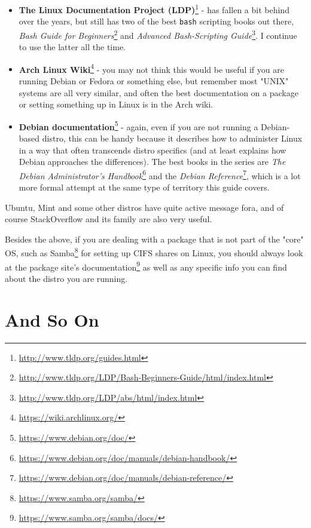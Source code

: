 \documentclass[10pt,american,]{book}
\renewcommand{\href}[2]{#2\footnote{\url{#1}}}
\numberwithin{figure}{chapter}
\DeclareRobustCommand{\drios}[1]{\index{OS and OS-Like Substances!#1}}
\begin{document}
\begin{itemize}
\item
  \href{http://www.tldp.org/guides.html}{\textbf{The Linux Documentation
  Project (LDP)}} - has
  fallen a bit behind over the years, but still has two of the best
  \texttt{bash} scripting books out there,
  \href{http://www.tldp.org/LDP/Bash-Beginners-Guide/html/index.html}{\emph{Bash
  Guide for
  Beginners}}\drios{bash}
  and \href{http://www.tldp.org/LDP/abs/html/index.html}{\emph{Advanced
  Bash-Scripting
  Guide}}. I
  continue to use the latter all the time.
\item
  \href{https://wiki.archlinux.org/}{\textbf{Arch Linux
  Wiki}} - you may not think this would
  be useful if you are running Debian or Fedora or something else, but
  remember most "UNIX" systems are all very similar, and often the best
  documentation on a package or setting something up in Linux is in the
  Arch wiki.
\item
  \href{https://www.debian.org/doc/}{\textbf{Debian documentation}} -
  again, even if you are not running a Debian-based distro, this can be
  handy because it describes how to administer Linux in a way that often
  transcends distro specifics (and at least explains how Debian
  approaches the differences). The best books in the series are
  \href{https://www.debian.org/doc/manuals/debian-handbook/}{\emph{The
  Debian Administrator's
  Handbook}}
  and the
  \href{https://www.debian.org/doc/manuals/debian-reference/}{\emph{Debian
  Reference}}, which is a
  lot more formal attempt at the same type of territory this guide
  covers.
\end{itemize}

Ubuntu, Mint and some other distros have quite active message fora, and
of course StackOverflow and its family are also very useful.

Besides the above, if you are dealing with a package that is not part of
the "core" OS, such as \href{https://www.samba.org/samba/}{Samba} for
setting up CIFS shares on Linux, you should always look at
\href{https://www.samba.org/samba/docs/}{the package site's
documentation} as well as any specific info you can find about the
distro you are running.

\hypertarget{and-so-on}{\chapter{And So On}\label{and-so-on}}
\end{document}
